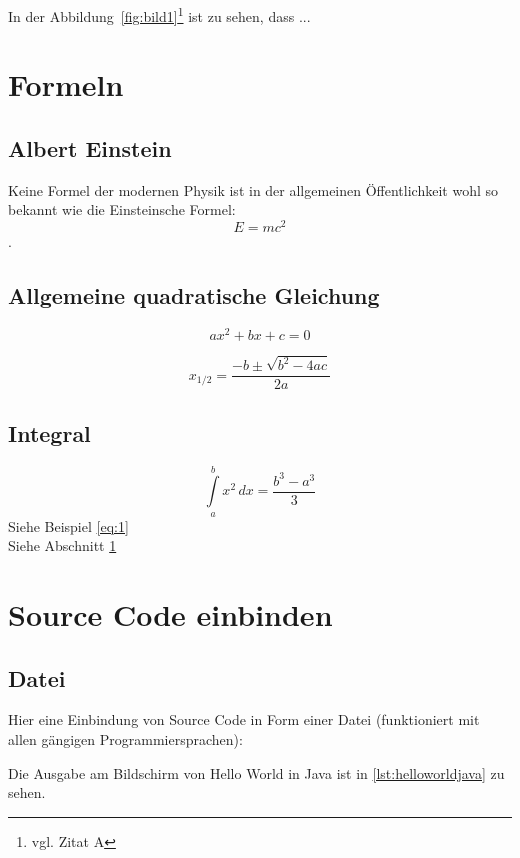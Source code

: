 In der Abbildung~\ref{fig:bild1}\footnote{vgl. Zitat A\cite{referenzA}} %
ist zu sehen, dass ...

\section{Formeln}
\label{sec:formeln}

\subsection{Albert Einstein}
Keine Formel der modernen Physik ist in der allgemeinen \"Offentlichkeit wohl so bekannt wie die Einsteinsche Formel:
\begin{equation*}
  E = mc^2
\end{equation*}.

\subsection{Allgemeine quadratische Gleichung}
\begin{equation*}
  ax^2 + bx + c = 0
\end{equation*}

\begin{equation*}
  x_{1/2} = \frac{-b \pm \sqrt{b^2-4ac}}{2a}
\end{equation*}

\subsection{Integral}
\begin{equation}
  \label{eq:1}
  \int\limits_{a}^{b} x^{2} \, dx = \frac{ b^{3} - a^{3} }{3}
\end{equation}
Siehe Beispiel \eqref{eq:1} \\
Siehe Abschnitt \ref{sec:formeln}

\section{Source Code einbinden}
\subsection{Datei}
Hier eine Einbindung von Source Code in Form einer Datei (funktioniert mit allen g\"angigen Programmiersprachen):

Die Ausgabe am Bildschirm von Hello World in Java ist in \ref{lst:helloworldjava} zu sehen.
